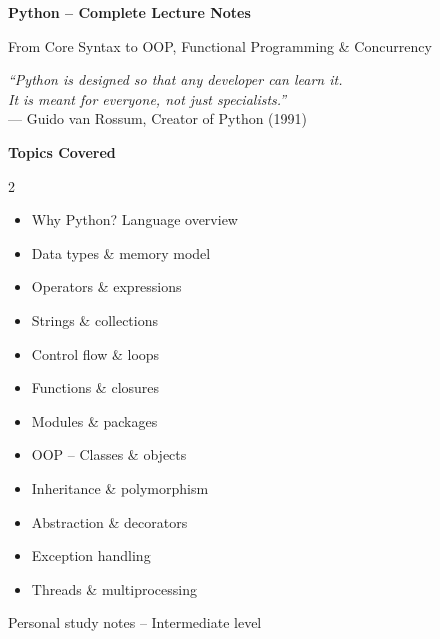 \documentclass[12pt,a4paper]{article}
\begin{document}

\begin{titlepage}
  \centering
  \vspace*{2cm}
  {\Huge\bfseries\color{pyblue} Python -- Complete Lecture Notes \par}
  \vspace{0.5cm}
  {\large\color{gray} From Core Syntax to OOP, Functional Programming \& Concurrency \par}
  \vspace{1.5cm}
  \begin{tcolorbox}[colback=pyblue!8, colframe=pyblue, width=0.8\textwidth]
    \centering
    \textit{``Python is designed so that any developer can learn it.\\
    It is meant for everyone, not just specialists.''} \\[4pt]
    \small --- Guido van Rossum, Creator of Python (1991)
  \end{tcolorbox}
  \vspace{1.5cm}
  {\large\bfseries Topics Covered \par}
  \vspace{0.4cm}
  \begin{multicols}{2}
    \begin{itemize}[leftmargin=1em]
      \item Why Python? Language overview
      \item Data types \& memory model
      \item Operators \& expressions
      \item Strings \& collections
      \item Control flow \& loops
      \item Functions \& closures
      \item Modules \& packages
      \item OOP -- Classes \& objects
      \item Inheritance \& polymorphism
      \item Abstraction \& decorators
      \item Exception handling
      \item Threads \& multiprocessing
    \end{itemize}
  \end{multicols}
  \vfill
  {\small\color{gray} Personal study notes -- Intermediate level \par}
\end{titlepage}
\end{document}

